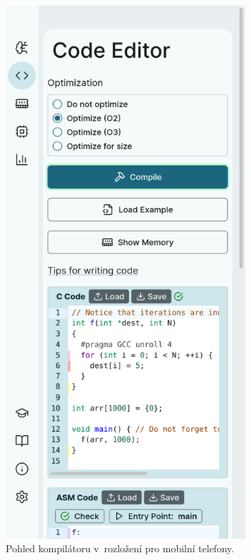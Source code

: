 \begin{figure}[hbtp]
\centering
    \includegraphics[width=9cm]{obrazky-figures/impl/mobile_layout_compiler.png}
    \caption{Pohled kompilátoru v~rozložení pro mobilní telefony.} 
    \label{mobile_layout}
\end{figure}



